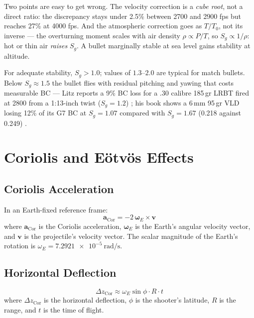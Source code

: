 \documentclass[11pt,twoside,openright]{report}
\newcommand{\vvec}{\bm{v}}
\newcommand{\avec}{\bm{a}}
\begin{document}
Two points are easy to get wrong. The velocity correction is a \emph{cube root}, not a direct ratio: the discrepancy stays under 2.5\% between 2700 and 2900 fps but reaches 27\% at 4000 fps. And the atmospheric correction goes as $T/T_0$, not its inverse --- the overturning moment scales with air density $\rho \propto P/T$, so $S_g \propto 1/\rho$: hot or thin air \emph{raises} $S_g$. A bullet marginally stable at sea level gains stability at altitude.

For adequate stability, $S_g > 1.0$; values of $1.3$--$2.0$ are typical for match bullets. Below $S_g \approx 1.5$ the bullet flies with residual pitching and yawing that costs measurable BC --- Litz reports a 9\% BC loss for a .30 calibre 185\,gr LRBT fired at \SI{2800}{\fps} from a 1:13-inch twist ($S_g = 1.2$) \citep{litz2014twist}; his book shows a 6\,mm 95\,gr VLD losing 12\% of its G7 BC at $S_g = 1.07$ compared with $S_g = 1.67$ (0.218 against 0.249) \citep[fig.~10.3, p.~163]{litz2015applied}.

\section{Coriolis and E\"otv\"os Effects}
\label{sec:coriolis}

\subsection{Coriolis Acceleration}

In an Earth-fixed reference frame:
\begin{equation}
  \avec_{\mathrm{Cor}} = -2\,\bm{\omega}_E \times \vvec
  \label{eq:coriolis}
\end{equation}
where $\avec_{\mathrm{Cor}}$ is the Coriolis acceleration, $\bm{\omega}_E$ is the Earth's angular velocity vector, and $\vvec$ is the projectile's velocity vector. The scalar magnitude of the Earth's rotation is $\omega_E = \SI{7.2921e-5}{\radian\per\second}$.

\subsection{Horizontal Deflection}

\begin{equation}
  \boxed{\Delta z_{\mathrm{Cor}} \approx \omega_E \sin\phi \cdot R \cdot t}
  \label{eq:coriolis_horiz}
\end{equation}
where $\Delta z_{\mathrm{Cor}}$ is the horizontal deflection, $\phi$ is the shooter's latitude, $R$ is the range, and $t$ is the time of flight.
\end{document}
